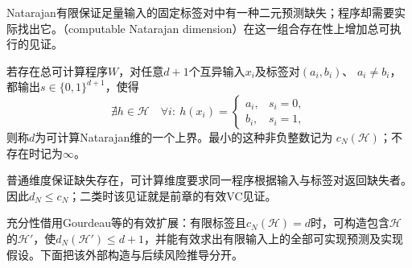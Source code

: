 Natarajan有限保证足量输入的固定标签对中有一种二元预测缺失；程序却需要实际找出它。（computable Natarajan dimension）在这一组合存在性上增加总可执行的见证。

\begin{definition}[可计算Natarajan维]
\label{def:computable-natarajan-dimension}
若存在总可计算程序$W$，对任意$d+1$个互异输入$x_i$及标签对$(a_i,b_i)$、
$a_i\neq b_i$，都输出$s\in\{0,1\}^{d+1}$，使得
\[
 \nexists h\in\mathcal H\quad
 \forall i:\ h(x_i)=\begin{cases}a_i,&s_i=0,\\b_i,&s_i=1,\end{cases}
\]
则称$d$为可计算Natarajan维的一个上界。最小的这种非负整数记为
$c_N(\mathcal H)$；不存在时记为$\infty$。
\end{definition}

普通维度保证缺失存在，可计算维度要求同一程序根据输入与标签对返回缺失者。因此$d_N\leq c_N$；二类时该见证就是前章的有效VC见证。

充分性借用Gourdeau等的有效扩展：有限标签且$c_N(\mathcal H)=d$时，可构造包含$\mathcal H$的$\mathcal H'$，使$d_N(\mathcal H')\leq d+1$，并能有效求出有限输入上的全部可实现预测及实现假设。下面把该外部构造与后续风险推导分开。

